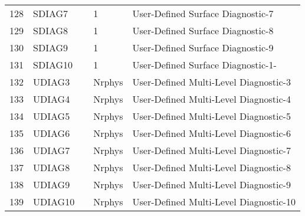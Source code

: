 \begin{tabular}{lllll}
128& SDIAG7   &             &    1  
         &\begin{minipage}[t]{3in}
          {User-Defined Surface Diagnostic-7} 
         \end{minipage}\\
129& SDIAG8   &             &    1  
         &\begin{minipage}[t]{3in}
          {User-Defined Surface Diagnostic-8} 
         \end{minipage}\\
130& SDIAG9   &             &    1  
         &\begin{minipage}[t]{3in}
          {User-Defined Surface Diagnostic-9} 
         \end{minipage}\\
131& SDIAG10  &             &    1  
         &\begin{minipage}[t]{3in}
          {User-Defined Surface Diagnostic-1-} 
         \end{minipage}\\
132& UDIAG3   &             &    Nrphys  
         &\begin{minipage}[t]{3in}
          {User-Defined Multi-Level Diagnostic-3} 
         \end{minipage}\\
133& UDIAG4   &             &    Nrphys  
         &\begin{minipage}[t]{3in}
          {User-Defined Multi-Level Diagnostic-4} 
         \end{minipage}\\
134& UDIAG5   &             &    Nrphys  
         &\begin{minipage}[t]{3in}
          {User-Defined Multi-Level Diagnostic-5} 
         \end{minipage}\\
135& UDIAG6   &             &    Nrphys  
         &\begin{minipage}[t]{3in}
          {User-Defined Multi-Level Diagnostic-6} 
         \end{minipage}\\
136& UDIAG7   &             &    Nrphys  
         &\begin{minipage}[t]{3in}
          {User-Defined Multi-Level Diagnostic-7} 
         \end{minipage}\\
137& UDIAG8   &             &    Nrphys  
         &\begin{minipage}[t]{3in}
          {User-Defined Multi-Level Diagnostic-8} 
         \end{minipage}\\
138& UDIAG9   &             &    Nrphys  
         &\begin{minipage}[t]{3in}
          {User-Defined Multi-Level Diagnostic-9} 
         \end{minipage}\\
139& UDIAG10  &             &    Nrphys  
         &\begin{minipage}[t]{3in}
          {User-Defined Multi-Level Diagnostic-10} 
         \end{minipage}\\
\end{tabular}
